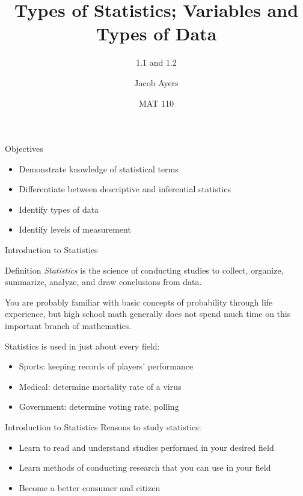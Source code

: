 \documentclass[t]{beamer}
\title[Abbr]{Types of Statistics; Variables and Types of Data}
\subtitle{1.1 and 1.2}
\author{Jacob Ayers}
\institute{Lesson \#1}
\date{MAT 110}
\newcommand{\?}{\stackrel{?}{=}}
\begin{document}
	
	\begin{frame}
		\titlepage
	\end{frame}
	
	\begin{frame}{Objectives}
		\begin{itemize}
			\item Demonstrate knowledge of statistical terms
			\item Differentiate between descriptive and inferential statistics
			\item Identify types of data
			\item Identify levels of measurement
		\end{itemize}
	\end{frame}

	\begin{frame}{Introduction to Statistics}
		\begin{block}{Definition}
			\textit{Statistics} is the science of conducting studies to collect, organize, summarize, analyze, and draw conclusions from data.
		\end{block}
	
		\pause
	
		You are probably familiar with basic concepts of probability through life experience, but high school math generally does not spend much time on this important branch of mathematics.
	
		Statistics is used in just about every field: \pause \begin{itemize}
			\item Sports: keeping records of players' performance \pause
			\item Medical: determine mortality rate of a virus \pause
			\item Government: determine voting rate, polling 
		\end{itemize}
	\end{frame}

	\begin{frame}{Introduction to Statistics}
		Reasons to study statistics: \pause \begin{itemize}
			\item Learn to read and understand studies performed in your desired field \pause
			\item Learn methods of conducting research that you can use in your field \pause
			\item Become a better consumer and citizen
		\end{itemize}
	\end{frame}
\end{document}
